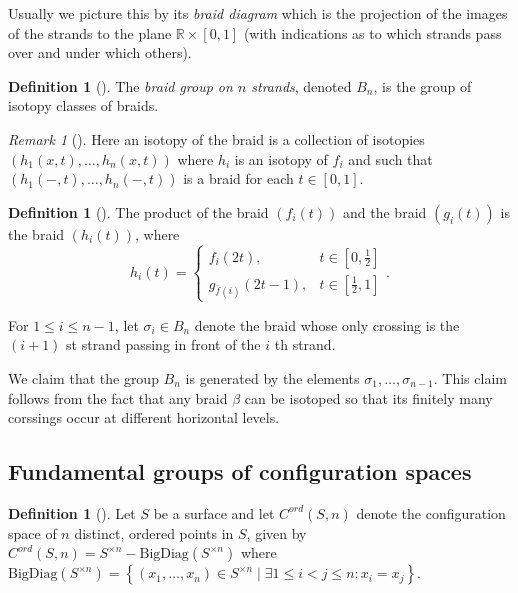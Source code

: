 \documentclass[reqno]{amsart}
\theoremstyle{definition}
\newtheorem{definition}[theorem]{Definition}
\theoremstyle{remark}
\newtheorem*{remark}{Remark}
\begin{document}
Usually we picture
this by its \textit{braid diagram} which is
the projection of the images of the strands to
the plane $\mathbb{R} \times \left[ 0,1 \right] $ (with
indications as to which strands pass over and under which
others).

\begin{definition}[]
    The \textit{braid group on $n$ strands}, denoted
    $B_n$, is the group of isotopy classes of braids.
\end{definition}

\begin{remark}[]
    Here an isotopy of the braid is a collection of isotopies
    $\left( h_1(x,t), \ldots, h_n(x,t) \right) $ where
    $h_i$ is an isotopy of $f_i$ and such that
    $\left( h_1 \left( -,t \right) , \ldots,
    h_n \left( -,t \right) \right) $ is a braid
    for each $t \in \left[ 0,1 \right] $.
\end{remark}

\begin{definition}[]
    The product of the braid $\left( f_i(t) \right) $ and
    the braid  $\left( g_i(t) \right) $ is the
    braid $\left( h_i(t) \right) $, where
    \[
    h_i(t) = 
    \begin{cases}
        f_i(2t),& t \in \left[ 0, \frac{1}{2} \right] \\
        g_{\overline{f}(i)}(2t-1),& t \in \left[ \frac{1}{2},1
        \right] 
    \end{cases}.
    \] 
\end{definition}

For $1 \le i \le n-1$, let
$\sigma_i \in B_n$ denote the braid
whose only crossing is the
$\left( i+1 \right) $ st strand passing in front
of the $i$ th strand.

We claim that the group $B_n$ is generated by
the elements $\sigma_1, \ldots, \sigma_{n-1}$.
This claim follows from the fact that any
braid $\beta$ can be isotoped so that
its finitely many corssings occur at different horizontal levels.

\subsection{Fundamental groups of configuration spaces}

\begin{definition}[]
    Let $S$ be a surface and let $C^{ord}(S,n)$ denote
    the configuration space of $n$ distinct, ordered
    points in $S$, given by
    $C^{ord} (S,n) = 
    S^{\times n} - \text{BigDiag}(S^{\times n})$
    where $\text{BigDiag}\left( S^{\times n} \right) 
    = \left\{ \left( 
    x_1, \ldots, x_n \right) \in 
 S^{\times n}  \mid \exists 1 \le i < j \le n \colon
x_i = x_j \right\} $.
\end{definition}
\end{document}
